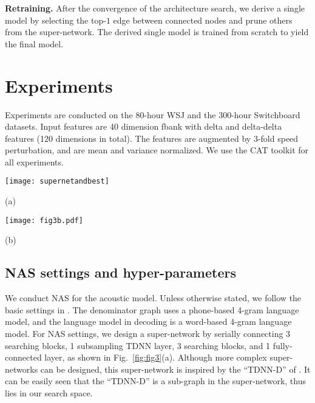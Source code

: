 \documentclass{article}
\newcommand{\figref}{Fig.~\ref}
\begin{document}
\textbf{Retraining.}
After the convergence of the architecture search, we derive a single model by selecting the top-$1$ edge between connected nodes and prune others from the super-network.
The derived single model is trained from scratch to yield the final model.

\vspace{-3mm}
\section{Experiments}
\label{sec:exp}
\vspace{-1mm}
Experiments are conducted on the 80-hour WSJ and the 300-hour Switchboard datasets. Input features are 40 dimension fbank with delta and delta-delta features (120 dimensions in total). The features are augmented by 3-fold speed perturbation, and are mean and variance normalized.
We use the CAT toolkit \cite{an2020cat} for all experiments.
\begin{figure*}[t]
    \begin{minipage}[t]{1.0\linewidth}
        \centering
        \texttt{[image: supernetandbest]}
\centerline{(a)}\medskip
    \end{minipage}
\begin{minipage}[b]{1.0\linewidth}
        \centering
        \texttt{[image: fig3b.pdf]}
\centerline{(b)}\medskip
    \end{minipage}
\vspace{-8mm}
    \caption{(a) shows the super-network for WSJ experiments. Labels of candidate operations over edges are formatted in ``-\{half of context\}-\{dilation\}''. In Switchboard experiments, we add extra ``TDNN-3-1'' and ``TDNN-3-2'' candidate operations to each searching blocks. The solid lines in (a) indicate one of the derived single model from the 5 runs of NAS on WSJ.
        (b) shows the evolution of architecture probabilities (i.e., $\pi_{ij}^{(k)}$) for the searching blocks in the NAS run that yields the derived single model in (a).}
    \label{fig:fig3}
\vspace{-6mm}
\end{figure*}
\vspace{-2mm}
\subsection{NAS settings and hyper-parameters}
\label{sec:exp:settings}
We conduct NAS for the acoustic model.
Unless otherwise stated, we follow the basic settings in \cite{xiang2019crf}.
The denominator graph uses a phone-based 4-gram language model, and the language model in decoding is a word-based 4-gram language model.
For NAS settings, we design a super-network by serially connecting 3 searching blocks, 1 subsampling TDNN layer, 3 searching blocks, and 1 fully-connected layer, as shown in \figref{fig:fig3}(a). Although more complex super-networks can be designed, this super-network is inspired by the ``TDNN-D'' of \cite{peddinti2018low}. It can be easily seen that the ``TDNN-D'' is a sub-graph in the super-network, thus lies in our search space.
\end{document}
